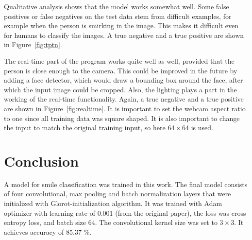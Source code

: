 \documentclass{article}
\begin{document}
Qualitative analysis shows that the model works somewhat well. Some
false positives or false negatives on the test data stem from
difficult examples, for example when the person is smirking in the
image. This makes it difficult even for humans to classify the images.
A true negative and a true positive are shown in
Figure~\ref{fig:tptn}.

The real-time part of the program works quite well as well, provided
that the person is close enough to the camera. This could be improved
in the future by adding a face detector, which would draw a bounding
box around the face, after which the input image could be cropped.
Also, the lighting plays a part in the working of the real-time
functionality. Again, a true negative and a true positive are shown in
Figure~\ref{fig:realtime}. It is important to set the webcam aspect
ratio to one since all training data was square shaped. It is also
important to change the input to match the original training input, so
here $64 \times 64$ is used.


\section{Conclusion}\label{sec:conclusion}
A model for smile classification was trained in this work. The final
model consists of four convolutional, max pooling and batch
normalization layers that were initialized with Glorot-initialization
algorithm. It was trained with Adam optimizer with learning rate of
0.001 (from the original paper), the loss was cross-entropy loss, and
batch size 64. The convolutional kernel size was set to $3 \times 3$.
It achieves accuracy of 85.37 \%.

\small






\vfill\pagebreak
\end{document}
